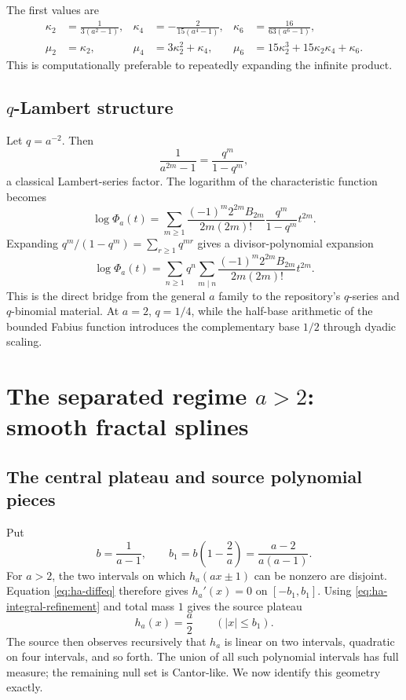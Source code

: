 \documentclass[11pt,oneside]{article}
\theoremstyle{definition}
\theoremstyle{remark}
\begin{document}
The first values are
\begin{align}
 \kappa_2&=\frac1{3(a^2-1)},
 &\kappa_4&=-\frac2{15(a^4-1)},
 &\kappa_6&=\frac{16}{63(a^6-1)},\label{eq:first-cumulants}\\
 \mu_2&=\kappa_2,
 &\mu_4&=3\kappa_2^2+\kappa_4,
 &\mu_6&=15\kappa_2^3+15\kappa_2\kappa_4+\kappa_6.
 \label{eq:first-moments}
\end{align}
This is computationally preferable to repeatedly expanding the infinite product.

\subsection{$q$-Lambert structure}

Let $q=a^{-2}$.  Then
\begin{equation}
 \frac1{a^{2m}-1}=\frac{q^m}{1-q^m},
 \label{eq:Lambert-factor}
\end{equation}
a classical Lambert-series factor.  The logarithm of the characteristic function becomes
\begin{equation}
 \log\Phi_a(t)=
 \sum_{m\ge1}
 \frac{(-1)^m2^{2m}B_{2m}}{2m(2m)!}
 \frac{q^m}{1-q^m}t^{2m}.
 \label{eq:logPhi-Lambert}
\end{equation}
Expanding $q^m/(1-q^m)=\sum_{r\ge1}q^{mr}$ gives a divisor-polynomial expansion
\begin{equation}
 \log\Phi_a(t)=\sum_{n\ge1}q^n
 \sum_{m\mid n}
 \frac{(-1)^m2^{2m}B_{2m}}{2m(2m)!}t^{2m}.
 \label{eq:divisor-polynomial}
\end{equation}
This is the direct bridge from the general $a$ family to the repository's $q$-series and
$q$-binomial material.  At $a=2$, $q=1/4$, while the half-base arithmetic of the bounded
Fabius function introduces the complementary base $1/2$ through dyadic scaling.

\section{The separated regime $a>2$: smooth fractal splines}
\label{sec:separated}

\subsection{The central plateau and source polynomial pieces}

Put
\begin{equation}
 b=\frac1{a-1},\qquad
 b_1=b\left(1-\frac2a\right)=\frac{a-2}{a(a-1)}.
 \label{eq:b-b1}
\end{equation}
For $a>2$, the two intervals on which $h_a(ax\pm1)$ can be nonzero are disjoint.
Equation \eqref{eq:ha-diffeq} therefore gives $h_a'(x)=0$ on $[-b_1,b_1]$.
Using \eqref{eq:ha-integral-refinement} and total mass $1$ gives the source plateau
\begin{equation}
 h_a(x)=\frac a2\qquad(|x|\le b_1).
 \tag{S3.40}
 \label{eq:central-plateau}
\end{equation}
The source then observes recursively that $h_a$ is linear on two intervals, quadratic on
four intervals, and so forth.  The union of all such polynomial intervals has full measure;
the remaining null set is Cantor-like.  We now identify this geometry exactly.
\end{document}
